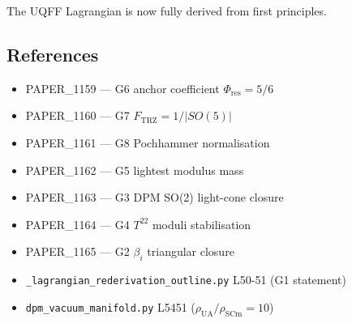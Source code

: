 \documentclass[
]{article}
\providecommand{\tightlist}{%
  \setlength{\itemsep}{0pt}\setlength{\parskip}{0pt}}
\begin{document}
The UQFF Lagrangian is now fully derived from first principles.

\subsection{References}\label{references}

\begin{itemize}
\tightlist
\item
  PAPER\_1159 --- G6 anchor coefficient \(\Phi_{\mathrm{res}} = 5/6\)
\item
  PAPER\_1160 --- G7 \(F_{\mathrm{TRZ}} = 1/|SO(5)|\)
\item
  PAPER\_1161 --- G8 Pochhammer normalisation
\item
  PAPER\_1162 --- G5 lightest modulus mass
\item
  PAPER\_1163 --- G3 DPM SO(2) light-cone closure
\item
  PAPER\_1164 --- G4 \(T^{22}\) moduli stabilisation
\item
  PAPER\_1165 --- G2 \(\beta_i\) triangular closure
\item
  \texttt{\_lagrangian\_rederivation\_outline.py} L50-51 (G1 statement)
\item
  \texttt{dpm\_vacuum\_manifold.py} L5451
  (\(\rho_{\mathrm{UA}}/\rho_{\mathrm{SCm}}=10\))
\end{itemize}
\end{document}
